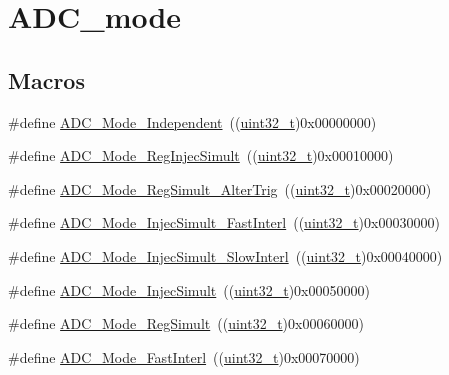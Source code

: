\hypertarget{group___a_d_c__mode}{}\section{A\+D\+C\+\_\+mode}
\label{group___a_d_c__mode}
\subsection*{Macros}
\begin{DoxyCompactItemize}
\item 
\#define \hyperlink{group___a_d_c__mode_ga2754d3a35559dc10e3d6a7d920e83432}{A\+D\+C\+\_\+\+Mode\+\_\+\+Independent}~((\hyperlink{_p_e___types_8h_a33594304e786b158f3fb30289278f5af}{uint32\+\_\+t})0x00000000)
\item 
\#define \hyperlink{group___a_d_c__mode_ga487d5f0c506291c5d37b53198396fd1c}{A\+D\+C\+\_\+\+Mode\+\_\+\+Reg\+Injec\+Simult}~((\hyperlink{_p_e___types_8h_a33594304e786b158f3fb30289278f5af}{uint32\+\_\+t})0x00010000)
\item 
\#define \hyperlink{group___a_d_c__mode_gae3d5fbf93f60d75534364bf9db78f632}{A\+D\+C\+\_\+\+Mode\+\_\+\+Reg\+Simult\+\_\+\+Alter\+Trig}~((\hyperlink{_p_e___types_8h_a33594304e786b158f3fb30289278f5af}{uint32\+\_\+t})0x00020000)
\item 
\#define \hyperlink{group___a_d_c__mode_ga2fc8a737f7b2375309bccbcb7fdbbfeb}{A\+D\+C\+\_\+\+Mode\+\_\+\+Injec\+Simult\+\_\+\+Fast\+Interl}~((\hyperlink{_p_e___types_8h_a33594304e786b158f3fb30289278f5af}{uint32\+\_\+t})0x00030000)
\item 
\#define \hyperlink{group___a_d_c__mode_gacb72230cb48a577907729d426be69c22}{A\+D\+C\+\_\+\+Mode\+\_\+\+Injec\+Simult\+\_\+\+Slow\+Interl}~((\hyperlink{_p_e___types_8h_a33594304e786b158f3fb30289278f5af}{uint32\+\_\+t})0x00040000)
\item 
\#define \hyperlink{group___a_d_c__mode_ga2339cc471aaf2db02daa4aeb49e9f0d9}{A\+D\+C\+\_\+\+Mode\+\_\+\+Injec\+Simult}~((\hyperlink{_p_e___types_8h_a33594304e786b158f3fb30289278f5af}{uint32\+\_\+t})0x00050000)
\item 
\#define \hyperlink{group___a_d_c__mode_ga71298f7453c2b4392a9c622328b3c93d}{A\+D\+C\+\_\+\+Mode\+\_\+\+Reg\+Simult}~((\hyperlink{_p_e___types_8h_a33594304e786b158f3fb30289278f5af}{uint32\+\_\+t})0x00060000)
\item 
\#define \hyperlink{group___a_d_c__mode_ga843ecdd53625e2088e91819e43106a7a}{A\+D\+C\+\_\+\+Mode\+\_\+\+Fast\+Interl}~((\hyperlink{_p_e___types_8h_a33594304e786b158f3fb30289278f5af}{uint32\+\_\+t})0x00070000)

\end{DoxyCompactItemize}
